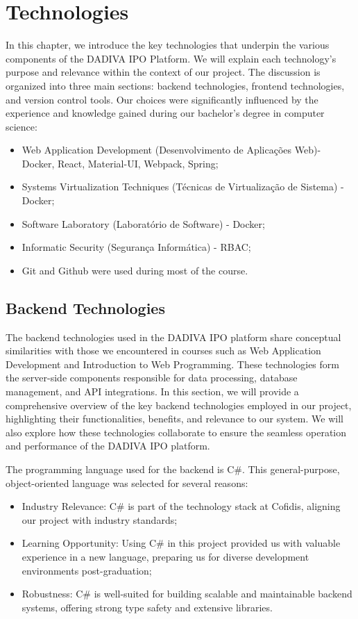 %
%
\chapter{Technologies} \label{cap:technologies}

 In this chapter, we introduce the key technologies that underpin the various components of the DADIVA IPO Platform. We will explain each technology's purpose and relevance within the context of our project. The discussion is organized into three main sections: backend technologies, frontend technologies, and version control tools. Our choices were significantly influenced by the experience and knowledge gained during our bachelor's degree in computer science:
\begin{itemize}
	\item Web Application Development (Desenvolvimento de Aplicações Web)- Docker, React, Material-UI, Webpack, Spring;
	\item Systems Virtualization Techniques (Técnicas de Virtualização de Sistema) - Docker;
	\item Software Laboratory (Laboratório de Software) - Docker;
	\item Informatic Security (Segurança Informática) - RBAC;
	\item Git and Github were used during most of the course.
\end{itemize}

\section{Backend Technologies}

The backend technologies used in the DADIVA IPO platform share conceptual similarities with those we encountered in courses such as Web Application Development and Introduction to Web Programming. These technologies form the server-side components responsible for data processing, database management, and API integrations. In this section, we will provide a comprehensive overview of the key backend technologies employed in our project, highlighting their functionalities, benefits, and relevance to our system. We will also explore how these technologies collaborate to ensure the seamless operation and performance of the DADIVA IPO platform.

The programming language used for the backend is C\#. This general-purpose, object-oriented language was selected for several reasons:
\begin{itemize}
	\item Industry Relevance: C\# is part of the technology stack at Cofidis, aligning our project with industry standards;
	\item Learning Opportunity: Using C\# in this project provided us with valuable experience in a new language, preparing us for diverse development environments post-graduation;
	\item Robustness: C\# is well-suited for building scalable and maintainable backend systems, offering strong type safety and extensive libraries.
\end{itemize}

